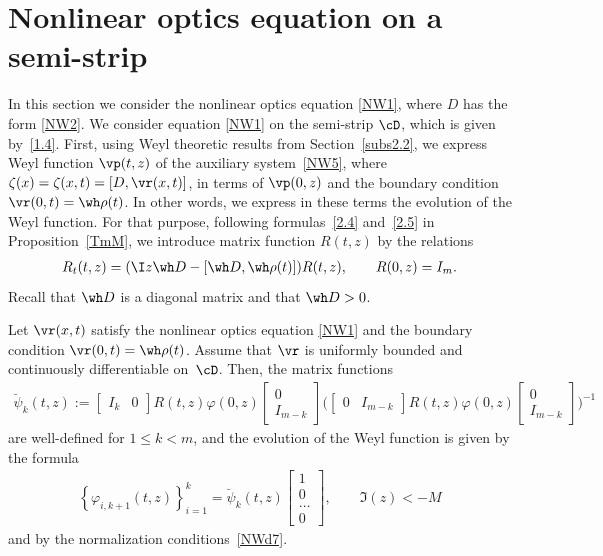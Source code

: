 \section{Nonlinear optics equation on a semi-strip} \label{NW}

In this section we consider the nonlinear optics equation \eqref{NW1}, where $D$ has the form \eqref{NW2}.
We consider equation \eqref{NW1} on the semi-strip $\cD$, which is given by~\eqref{1.4}. First, using Weyl theoretic
results from Section~\ref{subs2.2}, we express Weyl function $\vp(t,z)$ of the auxiliary system~\eqref{NW5},
where $\zeta(x)=\zeta(x,t)=[D,\vr(x,t)]$, in terms of $\vp(0,z)$ and
the boundary condition $\vr(0,t)=\wh \rho(t)$. In other words, we express in these terms the evolution of the Weyl function.
For that purpose, following formulas~\eqref{2.4} and~\eqref{2.5} in Proposition~\ref{TmM},
we introduce matrix function $R(t,z)$ by the relations
\begin{gather} \label{NW20}
R_t(t,z)=(\I z \wh D-[\wh D,\wh \rho(t)])R(t,z), \qquad R(0,z)=I_m.
\end{gather}
Recall that $\wh D$ is a diagonal matrix and that $\wh D>0$.
\begin{Theorem}
\label{TmNWevol}
Let $\vr(x,t)$ satisfy the nonlinear optics equation \eqref{NW1} and the boundary condition $\vr(0,t)=\wh \rho(t)$.
Assume that $\vr$ is uniformly bounded and continuously differentiable on~$\cD$.
Then, the matrix functions
\begin{gather} \label{NW21}
\breve \psi_k(t,z):=
 \begin{bmatrix} I_k & 0\end{bmatrix}
R(t,z) \varphi (0,z)
 \left[
  \begin{matrix}
    0  \\
    I_{m-k}
  \end{matrix}
 \right]
 \biggl(
 \begin{bmatrix} 0 & I_{m-k}\end{bmatrix}
  R(t,z) \varphi (0,z)
  \left[
  \begin{matrix}
    0  \\
    I_{m-k}
  \end{matrix}
  \right]
 \biggr)^{-1}
\end{gather}
are well-defined for $1\leq k <m$, and the evolution of the Weyl function is given by the formula
\begin{gather} \label{NW22}
  \left\{
   \varphi_{i, k+1}(t,z)
  \right\}_{i=1}^k
 = \breve \psi_k (t,z)\begin{bmatrix} 1\\ 0 \\ \ldots \\0
 \end{bmatrix}, \qquad \Im(z)<-M
\end{gather}
and by the normalization conditions~\eqref{NWd7}.
\end{Theorem}

